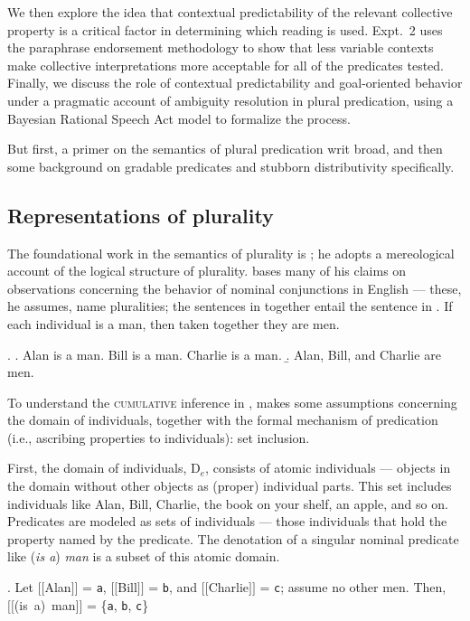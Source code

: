 \documentclass[linguex]{sp}
\newcommand{\sem}[1]{\mbox{$[\![$#1$]\!]$}}
\begin{document}
We then explore the idea that contextual predictability of the relevant collective property is a critical factor in determining which reading is used. Expt.~2 uses the paraphrase endorsement methodology to show that less variable contexts make collective interpretations more acceptable for all of the predicates tested. Finally, we discuss the role of contextual predictability and goal-oriented behavior under a pragmatic account of ambiguity resolution in plural predication, using a Bayesian Rational Speech Act model \citep{frankgoodman2012} to formalize the process.

But first, a primer on the semantics of plural predication writ broad, and then some background on gradable predicates and stubborn distributivity specifically.

\subsection{Representations of plurality}

The foundational work in the semantics of plurality is \cite{link1983}; he adopts a mereological account of the logical structure of plurality. \citeauthor{link1983} bases many of his claims on observations concerning the behavior of nominal conjunctions in English --- these, he assumes, name pluralities; the sentences in \Next[a] together entail the sentence in \Next[b]. If each individual is a man, then taken together they are men.

\ex. \label{cumulative}\a. Alan is a man. Bill is a man. Charlie is a man.
\b. Alan, Bill, and Charlie are men.

To understand the \textsc{cumulative} inference in \Last, \citeauthor{link1983} makes some assumptions concerning the domain of individuals, together with the formal mechanism of predication (i.e., ascribing properties to individuals): set inclusion.

First, the domain of individuals, D$_{e}$, consists of atomic individuals --- objects in the domain without other objects as (proper) individual parts. This set includes individuals like Alan, Bill, Charlie, the book on your shelf, an apple, and so on. Predicates are modeled as sets of individuals --- those individuals that hold the property named by the predicate. The denotation of a singular nominal predicate like (\emph{is a}) \emph{man} is a subset of this atomic domain.

\ex. \label{theboys} Let \sem{Alan} = \texttt{a}, \sem{Bill} = \texttt{b}, and \sem{Charlie} = \texttt{c}; assume no other men. Then,\\
 \sem{(is a) man} = \{\texttt{a}, \texttt{b}, \texttt{c}\}
\end{document}

